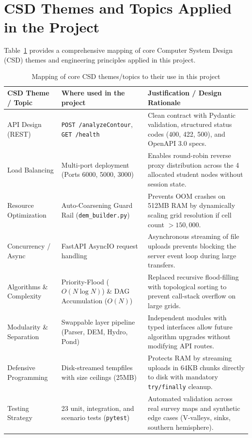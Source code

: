 \documentclass[manuscript,screen,review]{acmart}
\begin{document}
\section{CSD Themes and Topics Applied in the Project}
\label{sec:csd-themes}

Table~\ref{tab:csd-themes} provides a comprehensive mapping of core Computer System Design (CSD) themes and engineering principles applied in this project.

\begin{table}[t]
  \caption{Mapping of core CSD themes/topics to their use in this project}
  \label{tab:csd-themes}
  \small
  \begin{tabularx}{\linewidth}{p{3.2cm}p{5.4cm}X}
    \toprule
    \textbf{CSD Theme / Topic} & \textbf{Where used in the project} & \textbf{Justification / Design Rationale} \\
    \midrule
    API Design (REST) & \texttt{POST /analyzeContour}, \texttt{GET /health} & Clean contract with Pydantic validation, structured status codes (400, 422, 500), and OpenAPI 3.0 specs. \\
    Load Balancing & Multi-port deployment (Ports 6000, 5000, 3000) & Enables round-robin reverse proxy distribution across the 4 allocated student nodes without session state. \\
    Resource Optimization & Auto-Coarsening Guard Rail (\texttt{dem\_builder.py}) & Prevents OOM crashes on 512MB RAM by dynamically scaling grid resolution if cell count $>150,000$. \\
    Concurrency / Async & FastAPI AsyncIO request handling & Asynchronous streaming of file uploads prevents blocking the server event loop during large transfers. \\
    Algorithms \& Complexity & Priority-Flood ($O(N \log N)$) \& DAG Accumulation ($O(N)$) & Replaced recursive flood-filling with topological sorting to prevent call-stack overflow on large grids. \\
    Modularity \& Separation & Swappable layer pipeline (Parser, DEM, Hydro, Pond) & Independent modules with typed interfaces allow future algorithm upgrades without modifying API routes. \\
    Defensive Programming & Disk-streamed tempfiles with size ceilings (25MB) & Protects RAM by streaming uploads in 64KB chunks directly to disk with mandatory \texttt{try/finally} cleanup. \\
    Testing Strategy & 23 unit, integration, and scenario tests (\texttt{pytest}) & Automated validation across real survey maps and synthetic edge cases (V-valleys, sinks, southern hemisphere). \\

\end{tabularx}
\end{table}
\end{document}
